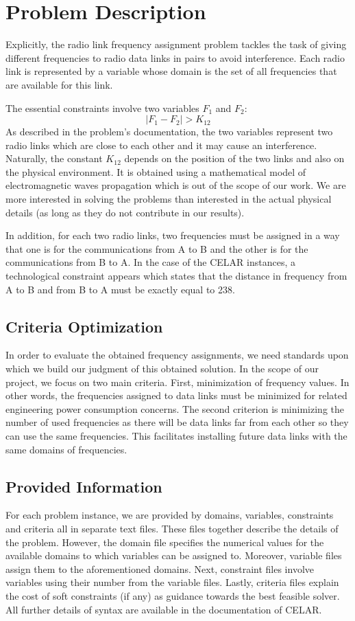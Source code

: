 \documentclass{article}
\begin{document}
	\section{Problem Description}
	Explicitly, the radio link frequency assignment problem tackles the task of giving different frequencies to radio data links in pairs to avoid interference. Each radio link is represented by a variable whose domain is the set of all frequencies that are available for this link. 
	
	The essential constraints involve two variables $F_1$ and $F_2$:\[|F_1 - F_2| > K_{12}\] 
	As described in the problem's documentation, the two variables represent two radio links which are close to each other and it may cause an interference. Naturally, the constant $K_{12}$ depends on the position of the two links and also on the physical environment. It is obtained using a mathematical model of electromagnetic waves propagation which is out of the scope of our work. We are more interested in solving the problems than interested in the actual physical details (as long as they do not contribute in our results).
	
	In addition, for each two radio links, two frequencies must be assigned in a way that one is for the communications from A to B and the other is for the communications from B to A. In the case of the CELAR instances, a technological constraint appears which states that the distance in frequency from A to B and from B to A must be exactly equal to 238.
	
	\subsection{Criteria Optimization}
	\label{criteria}
	In order to evaluate the obtained frequency assignments, we need standards upon which we build our judgment of this obtained solution. In the scope of our project, we focus on two main criteria. First, minimization of frequency values. In other words, the frequencies assigned to data links must be minimized for related engineering power consumption concerns. The second criterion is minimizing the number of used frequencies as there will be data links far from each other so they can use the same frequencies. This facilitates installing future data links with the same domains of frequencies.
	
	\subsection{Provided Information}
	For each problem instance, we are provided by domains, variables, constraints and criteria all in separate text files. These files together describe the details of the problem. However, the domain file specifies the numerical values for the available domains to which variables can be assigned to. Moreover, variable files assign them to the aforementioned domains. Next, constraint files involve variables using their number from the variable files. Lastly, criteria files explain the cost of soft constraints (if any) as guidance towards the best feasible solver. All further details of syntax are available in the documentation of CELAR.
	
\end{document}
